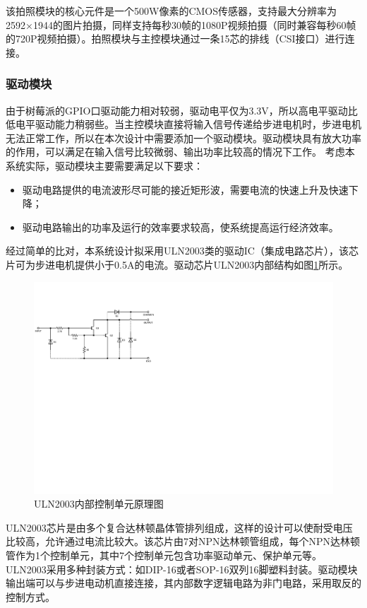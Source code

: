 该拍照模块的核心元件是一个500W像素的CMOS传感器，支持最大分辨率为2592×1944的图片拍摄，同样支持每秒30帧的1080P视频拍摄（同时兼容每秒60帧的720P视频拍摄）。拍照模块与主控模块通过一条15芯的排线（CSI接口）进行连接。

\subsubsection{驱动模块}
由于树莓派的GPIO口驱动能力相对较弱，驱动电平仅为3.3V，所以高电平驱动比低电平驱动能力稍弱些。当主控模块直接将输入信号传递给步进电机时，步进电机无法正常工作，所以在本次设计中需要添加一个驱动模块。驱动模块具有放大功率的作用，可以满足在输入信号比较微弱、输出功率比较高的情况下工作。
考虑本系统实际，驱动模块主要需要满足以下要求：

\begin{itemize}
	\item 驱动电路提供的电流波形尽可能的接近矩形波，需要电流的快速上升及快速下降；
	\item 驱动电路输出的功率及运行的效率要求较高，使系统提高运行经济效率。
\end{itemize}

经过简单的比对，本系统设计拟采用ULN2003类的驱动IC（集成电路芯片），该芯片可为步进电机提供小于0.5A的电流。驱动芯片ULN2003内部结构如图\ref{fig:ULN2003内部控制单元原理图}所示。

\begin{figure}[htbp]
	\centering
	\includegraphics[width=\textwidth]{figure/hardware-cir.pdf}
	\caption{ULN2003内部控制单元原理图}\label{fig:ULN2003内部控制单元原理图}
\end{figure}

ULN2003芯片是由多个复合达林顿晶体管排列组成，这样的设计可以使耐受电压比较高，允许通过电流比较大。该芯片由7对NPN达林顿管组成，每个NPN达林顿管作为1个控制单元，其中7个控制单元包含功率驱动单元、保护单元等。ULN2003采用多种封装方式：如DIP-16或者SOP-16双列16脚塑料封装。驱动模块输出端可以与步进电动机直接连接，其内部数字逻辑电路为非门电路，采用取反的控制方式。


